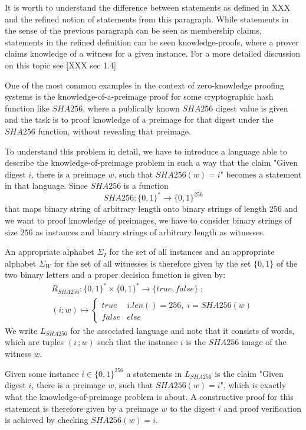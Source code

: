 It is worth to understand the difference between statements as defined in XXX and the refined notion of statements from this paragraph. While statements in the sense of the previous paragraph can be seen as membership claims, statements in the refined definition can be seen knowledge-proofs, where a prover claims knowledge of a witness for a given instance. For a more detailed discussion on this topic see [XXX sec 1.4]
\begin{example} One of the most common examples in the context of zero-knowledge proofing systems is the knowledge-of-a-preimage proof for some cryptographic hash function like $SHA256$, where a publically known $SHA256$ digest value is given and the task is to proof knowledge of a preimage for that digest under the $SHA256$ function, without revealing that preimage. 

To understand this problem in detail, we have to introduce a language able to describe the knowledge-of-preimage problem in such a way that the claim "Given digest $i$, there is a preimage $w$, such that $SHA256(w)=i$" becomes a statement in that language. Since $SHA256$ is a function
$$
SHA256: \{0,1\}^* \to \{0,1\}^{256}
$$
that maps binary string of arbitrary length onto binary strings of length $256$ and we want to proof knowledge of preimages, we have to consider binary strings of size $256$ as instances and binary strings of arbitrary length as witnesses. 

An appropriate alphabet $\Sigma_I$ for the set of all instances and an appropriate alphabet $\Sigma_W$ for the set of all witnesses is therefore given by the set $\{0,1\}$ of the two binary letters and a proper decision function is given by:
\begin{multline*}
R_{SHA256} : \{0,1\}^* \times \{0,1\}^* \to \{true, false\}\;;\;\\
(i;w) \mapsto
\begin{cases}
true & i.len()=256,\; i = SHA256(w)\\
false & else
\end{cases}
\end{multline*}
We write $L_{SHA256}$ for the associated language and note that it consists of words, which are tuples $(i\,;w)$ such that the instance $i$ is the $SHA256$ image of the witness $w$. 

Given some instance $i\in \{0,1\}^{256}$ a statements in $L_{SHA256}$ is the claim "Given digest $i$, there is a preimage $w$, such that $SHA256(w)=i$", which is exactly what the knowledge-of-preimage problem is about. A constructive proof for this statement is therefore given by a preimage $w$ to the digest $i$ and proof verification is achieved by checking $SHA256(w)=i$. 
\end{example}
